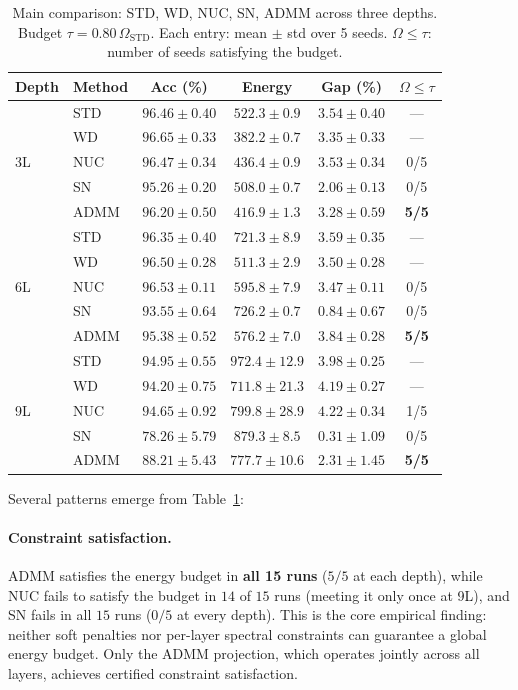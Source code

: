 \documentclass[a4paper,fleqn]{cas-sc}
\theoremstyle{remark}
\theoremstyle{definition}
\begin{document}
\begin{table}[ht]
\centering
\caption{Main comparison: STD, WD, NUC, SN, ADMM across three depths. Budget $\tau=0.80\,\Omega_{\mathrm{STD}}$. Each entry: mean $\pm$ std over 5 seeds. $\Omega\le\tau$: number of seeds satisfying the budget.}
\label{tab:comparison}
\begin{tabular}{llcccc}
\toprule
\textbf{Depth} & \textbf{Method} & \textbf{Acc (\%)} & \textbf{Energy} & \textbf{Gap (\%)} & $\Omega\le\tau$ \\
\midrule
\multirow{5}{*}{3L}
  & STD  & $96.46\pm 0.40$ & $522.3\pm 0.9$  & $3.54\pm 0.40$ & --- \\
  & WD   & $96.65\pm 0.33$ & $382.2\pm 0.7$  & $3.35\pm 0.33$ & --- \\
  & NUC  & $96.47\pm 0.34$ & $436.4\pm 0.9$  & $3.53\pm 0.34$ & 0/5 \\
  & SN   & $95.26\pm 0.20$ & $508.0\pm 0.7$  & $2.06\pm 0.13$ & 0/5 \\
  & ADMM & $96.20\pm 0.50$ & $416.9\pm 1.3$  & $3.28\pm 0.59$ & \textbf{5/5} \\
\midrule
\multirow{5}{*}{6L}
  & STD  & $96.35\pm 0.40$ & $721.3\pm 8.9$  & $3.59\pm 0.35$ & --- \\
  & WD   & $96.50\pm 0.28$ & $511.3\pm 2.9$  & $3.50\pm 0.28$ & --- \\
  & NUC  & $96.53\pm 0.11$ & $595.8\pm 7.9$  & $3.47\pm 0.11$ & 0/5 \\
  & SN   & $93.55\pm 0.64$ & $726.2\pm 0.7$  & $0.84\pm 0.67$ & 0/5 \\
  & ADMM & $95.38\pm 0.52$ & $576.2\pm 7.0$  & $3.84\pm 0.28$ & \textbf{5/5} \\
\midrule
\multirow{5}{*}{9L}
  & STD  & $94.95\pm 0.55$ & $972.4\pm 12.9$ & $3.98\pm 0.25$ & --- \\
  & WD   & $94.20\pm 0.75$ & $711.8\pm 21.3$ & $4.19\pm 0.27$ & --- \\
  & NUC  & $94.65\pm 0.92$ & $799.8\pm 28.9$ & $4.22\pm 0.34$ & 1/5 \\
  & SN   & $78.26\pm 5.79$ & $879.3\pm 8.5$  & $0.31\pm 1.09$ & 0/5 \\
  & ADMM & $88.21\pm 5.43$ & $777.7\pm 10.6$ & $2.31\pm 1.45$ & \textbf{5/5} \\
\bottomrule
\end{tabular}
\end{table}

Several patterns emerge from Table~\ref{tab:comparison}:

\paragraph{Constraint satisfaction.}
ADMM satisfies the energy budget in \textbf{all 15 runs} ($5/5$ at each depth), while NUC fails to satisfy the budget in $14$ of $15$ runs (meeting it only once at 9L), and SN fails in all $15$ runs ($0/5$ at every depth). This is the core empirical finding: neither soft penalties nor per-layer spectral constraints can guarantee a global energy budget. Only the ADMM projection, which operates jointly across all layers, achieves certified constraint satisfaction.
\end{document}
